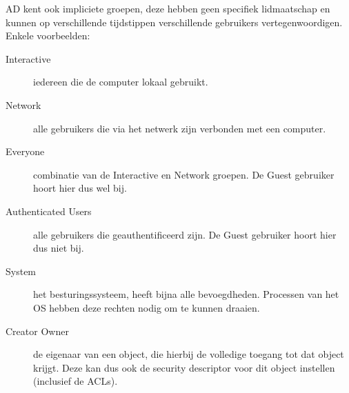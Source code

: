 AD kent ook impliciete groepen, deze hebben geen specifiek lidmaatschap en
kunnen op verschillende tijdstippen verschillende gebruikers vertegenwoordigen.
Enkele voorbeelden:
\begin{description}
	\item[Interactive] iedereen die de computer lokaal gebruikt.
	\item[Network] alle gebruikers die via het netwerk zijn verbonden met
		een computer.
	\item[Everyone] combinatie van de Interactive en Network groepen.
		De Guest gebruiker hoort hier dus wel bij.
	\item[Authenticated Users] alle gebruikers die geauthentificeerd zijn.
		De Guest gebruiker hoort hier dus niet bij.
	\item[System] het besturingssysteem, heeft bijna alle bevoegdheden.
		Processen van het OS hebben deze rechten nodig om te kunnen
		draaien.
	\item[Creator Owner] de eigenaar van een object, die hierbij de 
		volledige toegang tot dat object krijgt.
		Deze kan dus ook de security descriptor voor dit object instellen 
		(inclusief de ACLs).
\end{description}

